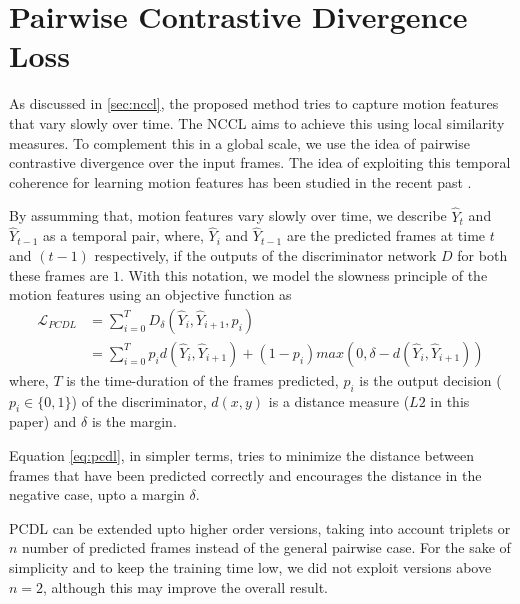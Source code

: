 \documentclass{article}
\begin{document}
\section{Pairwise Contrastive Divergence Loss}
  \label{sec:pcdl}
  As discussed in \ref{sec:nccl}, the proposed method tries to capture motion features that vary slowly over time. The NCCL aims to achieve this using local similarity measures. To complement this in a global scale, we use the idea of pairwise contrastive divergence over the input frames. The idea of exploiting this temporal coherence for learning motion features has been studied in the recent past \cite{goroshin2015unsupervised, hadsell2006dimensionality,  mobahi2009deep}.
  
  By assumming that, motion features vary slowly over time, we describe $ \hat{Y}_t $ and $ \hat{Y}_{t-1} $ as a temporal pair, where, $ \hat{Y}_i $ and $ \hat{Y}_{t-1} $ are the predicted frames at time $ t $ and $ (t-1) $ respectively, if the outputs of the discriminator network $ D $ for both these frames are $ 1 $. With this notation, we model the slowness principle of the motion features using an objective function as
  \begin{equation}
	  \begin{split}
		  \mathcal{L}_{PCDL} & = \sum_{i = 0}^{T} D_{\delta}(\hat{Y}_i, \hat{Y}_{i + 1}, p_i) \\
		  & = \sum_{i = 0}^{T} p_i d(\hat{Y}_i, \hat{Y}_{i + 1}) + (1 - p_i) max(0, \delta - d(\hat{Y}_i, \hat{Y}_{i + 1}))
	  \end{split}
	  \label{eq:pcdl}
  \end{equation}   
  where, $ T $ is the time-duration of the frames predicted, $ p_i $ is the output decision ($p_i \in \{0, 1\} $) of the discriminator, $ d(x, y) $ is a distance measure ($ L2 $ in this paper) and $ \delta $ is the margin.
  
  Equation \ref{eq:pcdl}, in simpler terms, tries to minimize the distance between frames that have been predicted correctly and encourages the distance in the negative case, upto a margin $ \delta $.
  
  PCDL can be extended upto higher order versions, taking into account triplets or $ n $ number of predicted frames instead of the general pairwise case. For the sake of simplicity and to keep the training time low, we did not exploit versions above $ n = 2 $, although this may improve the overall result. 
\end{document}
